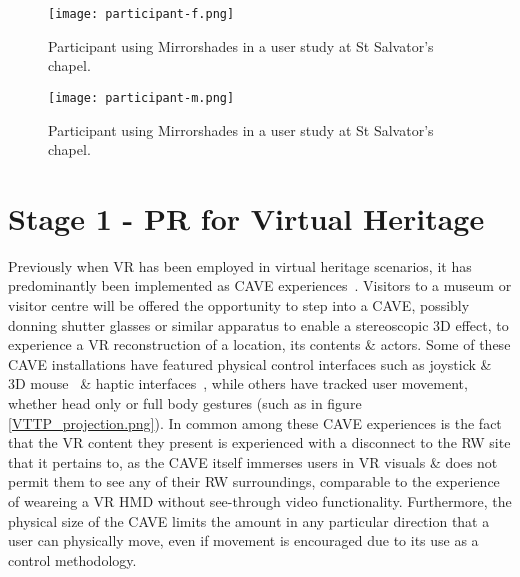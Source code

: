 \begin{figure}[ht]
	\begin{center}
		\texttt{[image: participant-f.png]}
		\caption{Participant using Mirrorshades in a user study at St Salvator's chapel.}
		\label{participant-f.png}
	\end{center}
\end{figure}

\begin{figure}[ht]
	\begin{center}
		\texttt{[image: participant-m.png]}
		\caption{Participant using Mirrorshades in a user study at St Salvator's chapel.}
		\label{participant-m.png}
	\end{center}
\end{figure}


\section{Stage 1 - PR for Virtual Heritage}

Previously when VR has been employed in virtual heritage scenarios, it has predominantly been implemented as CAVE experiences~\cite{Roussou2002}. Visitors to a museum or visitor centre will be offered the opportunity to step into a CAVE, possibly donning shutter glasses or similar apparatus to enable a stereoscopic 3D effect, to experience a VR reconstruction of a location, its contents \& actors. Some of these CAVE installations have featured physical control interfaces such as joystick \& 3D mouse~\cite{cabral:x3dexperience} \& haptic interfaces~\cite{Christou2006}, while others have tracked user movement, whether head only or full body  gestures (such as in figure \ref{VTTP_projection.png}). In common among these CAVE experiences is the fact that the VR content they present is experienced with a disconnect to the RW site that it pertains to, as the CAVE itself immerses users in VR visuals \& does not permit them to see any of their RW surroundings, comparable to the experience of weareing a VR HMD without see-through video functionality. Furthermore, the physical size of the CAVE limits the amount in any particular direction that a user can physically move, even if movement is encouraged due to its use as a control methodology.

